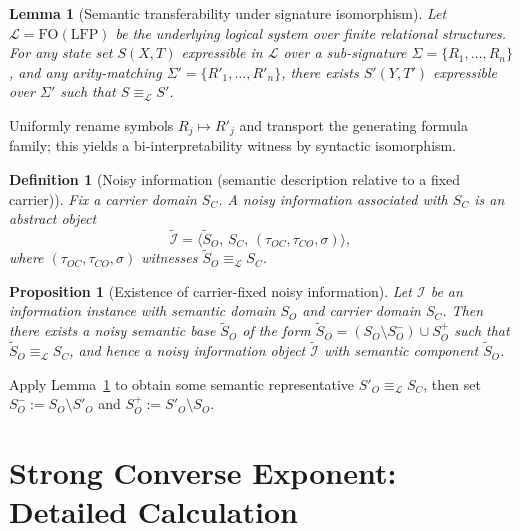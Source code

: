 \documentclass[journal]{IEEEtran}
\makeatletter
\newtheorem{lemma}{Lemma}[section]
\newtheorem{proposition}{Proposition}[section]
\newtheorem{definition}{Definition}[section]
\numberwithin{equation}{section}
\renewenvironment{proof}[1][\proofname]{\par
  \pushQED{\qed}%
  \normalfont \topsep6\p@\@plus6\p@\relax
  \trivlist
  \item[\hskip\labelsep
        \itshape
    #1\@addpunct{.}]\ignorespaces
}{%
  \popQED\endtrivlist\@endpefalse
}
\makeatother
\begin{document}
\begin{lemma}[Semantic transferability under signature isomorphism]
\label{lem:sem-trans}
Let \(\mathcal{L}=\mathrm{FO(LFP)}\) be the underlying logical system over finite relational structures.
For any state set \(S(X,T)\) expressible in \(\mathcal{L}\) over a sub-signature \(\Sigma=\{R_1,\ldots,R_n\}\),
and any arity-matching \(\Sigma'=\{R'_1,\ldots,R'_n\}\), there exists \(S'(Y,T')\) expressible over \(\Sigma'\)
such that \(S\equiv_{\mathcal{L}}S'\).
\end{lemma}

\begin{proof}
Uniformly rename symbols \(R_j\mapsto R'_j\) and transport the generating formula family; this yields a
bi-interpretability witness by syntactic isomorphism.
\end{proof}

\begin{definition}[Noisy information (semantic description relative to a fixed carrier)]
\label{def:noisy-info}
Fix a carrier domain \(S_C\).
A \emph{noisy information} associated with \(S_C\) is an abstract object
\[
  \tilde{\mathcal I}=\langle \tilde S_O,\, S_C,\, (\tau_{OC},\tau_{CO},\sigma)\rangle,
\]
where \((\tau_{OC},\tau_{CO},\sigma)\) witnesses \(\tilde S_O \equiv_{\mathcal L} S_C\).
\end{definition}

\begin{proposition}[Existence of carrier-fixed noisy information]
\label{prop:noisy-exist}
Let \(\mathcal I\) be an information instance with semantic domain \(S_O\) and carrier domain \(S_C\).
Then there exists a noisy semantic base \(\tilde S_O\) of the form
\(\tilde S_O=(S_O\setminus S_O^-)\cup S_O^+\) such that \(\tilde S_O \equiv_{\mathcal L} S_C\),
and hence a noisy information object \(\tilde{\mathcal I}\) with semantic component \(\tilde S_O\).
\end{proposition}

\begin{proof}
Apply Lemma~\ref{lem:sem-trans} to obtain some semantic representative \(S'_O\equiv_\mathcal L S_C\),
then set \(S_O^-:=S_O \setminus S'_O\) and \(S_O^+:=S'_O\setminus S_O\).
\end{proof}

\section{Strong Converse Exponent: Detailed Calculation}
\label{app:sc-exponent-calc}
\end{document}
